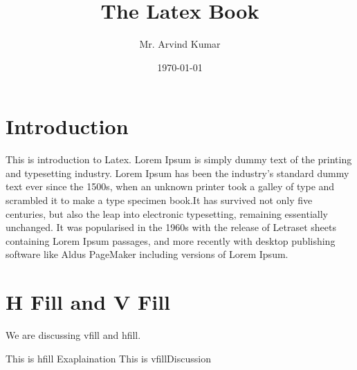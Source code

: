\documentclass{book}
\begin{document}
	\title{The Latex Book}
	\author{Mr. Arvind Kumar}
	\date{\today}
	\maketitle
	\tableofcontents
	\newpage
	\chapter{Introduction}
	This is introduction to Latex. Lorem Ipsum is simply dummy text of the printing and typesetting industry. Lorem Ipsum has been the industry's standard dummy text ever since the 1500s, when an unknown printer took a galley of type and scrambled it to make a type specimen book.It has survived not only five centuries, but also the leap into electronic typesetting, remaining essentially unchanged. It was popularised in the 1960s with the release of Letraset sheets containing Lorem Ipsum passages, and more recently with desktop publishing software like Aldus PageMaker including versions of Lorem Ipsum.
	
	\chapter{H Fill and V Fill}
	We are discussing vfill and hfill. 
	
	This is hfill \hfill Exaplaination
	\newpage
	This is vfill\vfill Discussion
\end{document}
